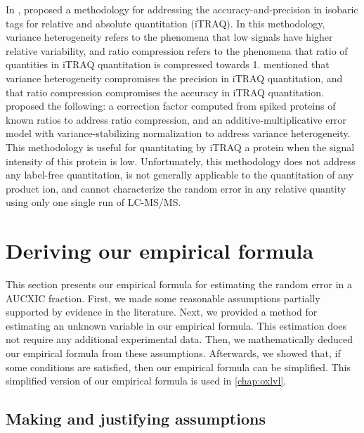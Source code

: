 In \citeyear{karp2010addressing},  
	\citet{karp2010addressing} proposed a methodology for addressing the accuracy-and-precision in isobaric tags for relative and absolute quantitation (iTRAQ). 
In this methodology, 
	variance heterogeneity refers to the phenomena that low signals have higher relative variability,
	and ratio compression  refers to the phenomena that ratio of quantities in iTRAQ quantitation is compressed towards 1.
 mentioned that variance heterogeneity compromises the precision in iTRAQ quantitation,
	and that ratio compression compromises the accuracy in iTRAQ quantitation.
 proposed the following:
	a correction factor computed from spiked proteins of known ratios to address ratio compression,
	and an additive-multiplicative error model with variance-stabilizing normalization to address variance heterogeneity.
This methodology is useful for quantitating by iTRAQ a protein when the signal intensity of this protein is low.
Unfortunately,
	this methodology does not address any label-free quantitation,
	is not generally applicable to the quantitation of any product ion,
	and cannot characterize the random error in any relative quantity using only one single run of \gls{LC-MS/MS}.

\section{Deriving our empirical formula}

This section presents our empirical formula for estimating the random error in a \gls{AUCXIC} fraction.
First, we made some reasonable assumptions partially supported by evidence in the literature.
Next, we provided a method for estimating an unknown variable in our empirical formula.
This estimation does not require any additional experimental data.
Then, we mathematically deduced our empirical formula from these assumptions.
Afterwards, we showed that, if some conditions are satisfied, then our empirical formula can be simplified.
This simplified version of our empirical formula is used in \cref{chap:oxlvl}.
	
\subsection{Making and justifying assumptions}

